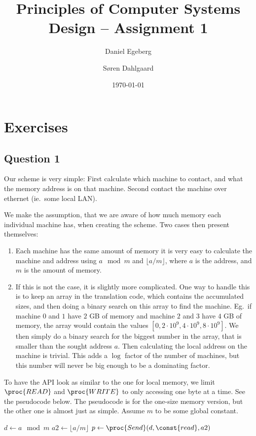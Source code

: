 \documentclass[a4paper,final]{article}
\title{Principles of Computer Systems Design -- Assignment 1}
\date{\today}
\author{Daniel Egeberg \and Søren Dahlgaard}
\begin{document}
\maketitle

\section{Exercises}

\subsection*{Question 1}
Our scheme is very simple: First calculate which machine to contact, and what
the memory address is on that machine. Second contact the machine over ethernet
(ie.~some local LAN).

We make the assumption, that we are aware of how much memory each individual
machine has, when creating the scheme. Two cases then present themselves:
\begin{enumerate}
    \item Each machine has the same amount of memory it is very easy to
        calculate the machine and address using $a\mod m$ and
        $\lfloor a/m \rfloor$, where $a$ is the address, and $m$ is the amount
        of memory.
    \item If this is not the case, it is slightly more complicated. One way to
        handle this is to keep an array in the translation code, which contains
        the accumulated sizes, and then doing a binary search on this array to
        find the machine. Eg.~if machine $0$ and $1$ have $2$ GB of memory and
        machine $2$ and $3$ have $4$ GB of memory, the array would contain
        the values $[0, 2\cdot 10^9, 4\cdot 10^9, 8\cdot 10^9]$. We then simply
        do a binary search for the biggest number in the array, that is smaller
        than the sought address $a$. Then calculating the local address on the
        machine is trivial. This adds a $\log$ factor of the number of
        machines, but this number will never be big enough to be a dominating
        factor.
\end{enumerate}

To have the API look as similar to the one for local memory, we limit
$\proc{READ}$ and $\proc{WRITE}$ to only accessing one byte at a time. See the
pseudocode below. The pseudocode is for the one-size memory version, but the
other one is almost just as simple. Assume $m$ to be some global constant.

\begin{codebox}
    \li $d\gets a\mod m$
    \li $a2\gets \lfloor a/m \rfloor$
    \li $p\gets\proc{Send}(d, \const{read}, a2)$
\end{codebox}
\end{document}
